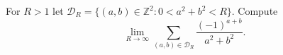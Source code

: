 \documentclass{article}
\begin{document}
\setlength{\parindent}{0pt}
For \(\displaystyle R>1\) let \(\displaystyle \mathcal{D}_R = \{(a,b)\in\mathbb{Z}^2 \colon0<a^2+b^2<R\}\). Compute$$\lim_{R\rightarrow \infty} \sum_{(a,b) \in \mathcal{D}_R}\frac{(-1)^{a+b}}{a^2+b^2}.$$
\end{document}
